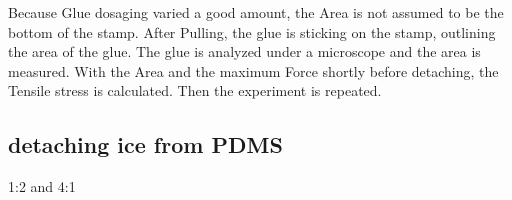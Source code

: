 Because Glue dosaging varied a good amount, the Area is not assumed to be the bottom of the stamp. After Pulling, the glue is sticking on the stamp, outlining the area of the glue. The glue is analyzed under a microscope and the area is measured. With the Area and the maximum Force shortly before detaching, the Tensile stress is calculated. Then the experiment is repeated.



\subsection{detaching ice from PDMS}

1:2 and 4:1

